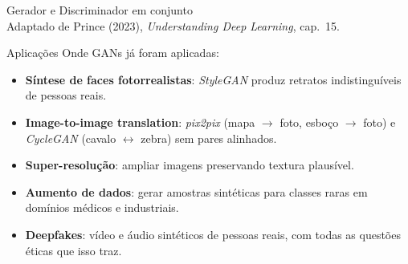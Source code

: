 \documentclass[aspectratio=169,xcolor=dvipsnames]{beamer}
\begin{document}
  \begin{frame}{Gerador e Discriminador em conjunto}
    \centering
    \resizebox{0.86\linewidth}{!}{\ganpipelinefigure}\\
    \vspace{0.2em}
    \tiny Adaptado de Prince (2023), \emph{Understanding Deep Learning},
    cap.~15.
  \end{frame}

  \begin{frame}{Aplicações}
    Onde GANs já foram aplicadas:
    \begin{itemize}
      \item \textbf{Síntese de faces fotorrealistas}: \textit{StyleGAN}
       produz retratos indistinguíveis de
      pessoas reais.
      \item \textbf{Image-to-image translation}:
      \textit{pix2pix} (mapa $\to$ foto,
      esboço $\to$ foto) e \textit{CycleGAN}
      (cavalo $\leftrightarrow$ zebra) sem pares alinhados.
      \item \textbf{Super-resolução}: ampliar imagens preservando
      textura plausível.
      \item \textbf{Aumento de dados}: gerar amostras sintéticas para
      classes raras em domínios médicos e industriais.
      \item \textbf{Deepfakes}: vídeo e áudio sintéticos de pessoas
      reais, com todas as questões éticas que isso traz.
    \end{itemize}
  \end{frame}
\end{document}
